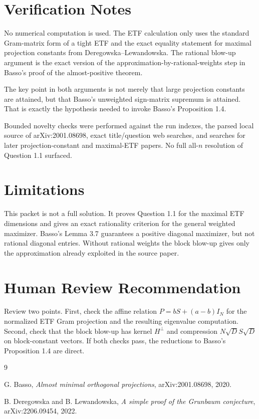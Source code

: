 \documentclass[11pt]{article}
\begin{document}
\section*{Verification Notes}

No numerical computation is used.  The ETF calculation only uses the standard
Gram-matrix form of a tight ETF and the exact equality statement for maximal
projection constants from Deregowska--Lewandowska.  The rational blow-up
argument is the exact version of the approximation-by-rational-weights step in
Basso's proof of the almost-positive theorem.

The key point in both arguments is not merely that large projection constants
are attained, but that Basso's unweighted sign-matrix supremum is attained.
That is exactly the hypothesis needed to invoke Basso's Proposition 1.4.

Bounded novelty checks were performed against the run indexes, the parsed
local source of arXiv:2001.08698, exact title/question web searches, and
searches for later projection-constant and maximal-ETF papers.  No full
all-$n$ resolution of Question 1.1 surfaced.

\section*{Limitations}

This packet is not a full solution.  It proves Question 1.1 for the maximal
ETF dimensions and gives an exact rationality criterion for the general
weighted maximizer.  Basso's Lemma 3.7 guarantees a positive diagonal
maximizer, but not rational diagonal entries.  Without rational weights the
block blow-up gives only the approximation already exploited in the source
paper.

\section*{Human Review Recommendation}

Review two points.  First, check the affine relation
$P=bS+(a-b)I_N$ for the normalized ETF Gram projection and the resulting
eigenvalue computation.  Second, check that the block blow-up has kernel
$H^\perp$ and compression $N\sqrt D S\sqrt D$ on block-constant vectors.  If
both checks pass, the reductions to Basso's Proposition 1.4 are direct.

\begin{thebibliography}{9}

G. Basso,
\emph{Almost minimal orthogonal projections},
arXiv:2001.08698, 2020.

B. Deregowska and B. Lewandowska,
\emph{A simple proof of the Grunbaum conjecture},
arXiv:2206.09454, 2022.

\end{thebibliography}
\end{document}
